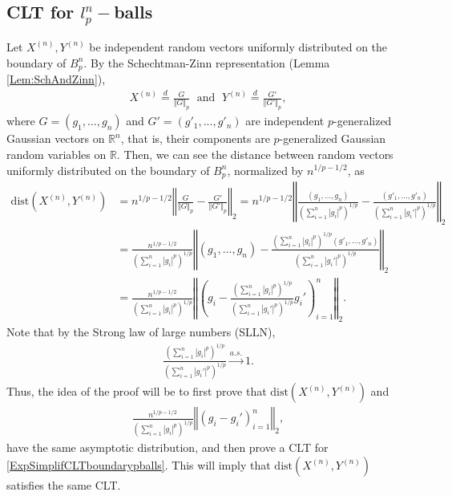 \documentclass[10pt]{amsart}
\def\R{\mathbb{R}}
\def\dist{\text{dist}}
\numberwithin{equation}{section}
\begin{document}
\subsection{CLT for $l_p^n-$balls}
Let $X^{(n)},Y^{(n)}$ be independent random vectors uniformly distributed on the boundary of $B_p^n$. By the Schechtman-Zinn representation (Lemma \ref{Lem:SchAndZinn}), 
\begin{align*}
X^{(n)} \overset{d}{=} \frac{G}{\Vert G \Vert _p} \; \text{ and } \; Y^{(n)} \overset{d}{=} \frac{G'}{\Vert G' \Vert _p},
\end{align*}
where $G=(g_1,...,g_n)$ and $G'=(g'_1,...,g'_n)$ are independent $p$-generalized Gaussian vectors on $\R^n$, that is, their components are $p$-generalized Gaussian random variables on $\R$.
Then, we can see the distance between random vectors uniformly distributed on the boundary of $B_p^n$, normalized by $n^{1/p - 1/2}$, as 
\begin{align*}
\dist( X^{(n)} , Y^{(n)}  ) & = n^{1/p - 1/2} \left\Vert \frac{G}{\Vert G \Vert_p} - \frac{G'}{\Vert G' \Vert_p} \right\Vert _2 
 = n^{1/p - 1/2} \left\Vert \frac{(g_1,...,g_n)}{\left(\sum _{i=1}^n \left| g_i  \right|^p \right)^{1/p}} - 
 \frac{(g'_1,...,g'_n)}{\left(\sum _{i=1}^n \left| g_i'  \right|^p \right)^{1/p}} \right\Vert _2
 \\
 & = \frac{n^{1/p - 1/2}}{\left(\sum _{i=1}^n \left| g_i  \right|^p \right)^{1/p}} \left\Vert (g_1,...,g_n) - 
 \frac{\left(\sum _{i=1}^n \left| g_i  \right|^p \right)^{1/p} (g'_1,...,g'_n)}{\left(\sum _{i=1}^n \left| g_i'  \right|^p \right)^{1/p}} \right\Vert _2
 \\
 & =  \frac{n^{1/p - 1/2}}{\left(\sum _{i=1}^n \left| g_i  \right|^p \right)^{1/p}} \left\Vert   \left( g_i - 
 \frac{\left(\sum _{i=1}^n \left| g_i  \right|^p  \right)^{1/p} }{\left(\sum _{i=1}^n \left| g_i'  \right|^p \right)^{1/p}} g_i' \right)_{i=1}^n \right\Vert _2.
\end{align*}
Note that by the Strong law of large numbers (SLLN), 
\begin{align*}
\frac{\left(\sum _{i=1}^n \left| g_i  \right|^p  \right)^{1/p} }{\left(\sum _{i=1}^n \left| g_i'  \right|^p \right)^{1/p}} \overset{a.s.}{\longrightarrow} 1 .
\end{align*}
Thus, the idea of the proof will be to first prove that $\dist( X^{(n)} , Y^{(n)} )$ and 
\begin{align}
\label{ExpSimplifCLTboundarypballs}
\frac{n^{1/p-1/2}}{\left(\sum _{i=1}^n \left| g_i  \right|^p \right)^{1/p}} \left\Vert   \left( g_i - 
   g_i' \right)_{i=1}^n \right\Vert _2,
\end{align}
have the same asymptotic distribution, and then prove a CLT for \eqref{ExpSimplifCLTboundarypballs}. This will imply that $\dist(X^{(n)} , Y^{(n)})$ satisfies the same CLT.
\end{document}
